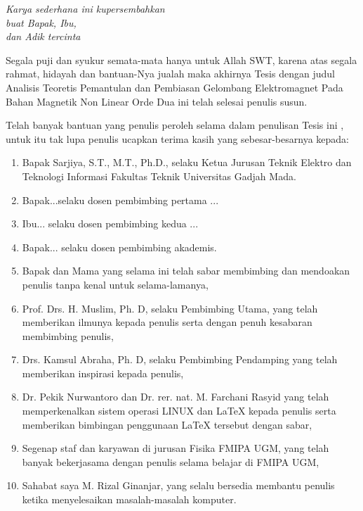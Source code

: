 \documentclass{jtetiskripsi}
\begin{document}
\cover

\approvalpage

\acknowledgment
\begin{flushright}
\emph{Karya sederhana ini kupersembahkan \\
buat Bapak, Ibu,\\dan Adik tercinta}
\end{flushright}

\preface
Segala puji dan syukur semata-mata hanya untuk Allah SWT, karena atas segala
rahmat, hidayah dan bantuan-Nya jualah maka akhirnya Tesis dengan judul
Analisis Teoretis Pemantulan dan Pembiasan Gelombang Elektromagnet Pada
Bahan Magnetik Non Linear Orde Dua ini telah selesai penulis susun.

Telah banyak bantuan yang penulis peroleh selama dalam penulisan Tesis ini
, untuk itu tak lupa penulis ucapkan terima kasih yang sebesar-besarnya
kepada:
\begin{enumerate}
\item{Bapak Sarjiya, S.T., M.T., Ph.D., selaku Ketua Jurusan Teknik Elektro dan Teknologi Informasi Fakultas Teknik Universitas Gadjah Mada.}
\item{Bapak...selaku dosen pembimbing pertama ...}
\item{Ibu... selaku dosen pembimbing kedua ...}
\item{Bapak... selaku dosen pembimbing akademis.}
\item{Bapak dan Mama yang selama ini telah sabar membimbing dan mendoakan
penulis tanpa kenal untuk selama-lamanya,}
\item{Prof. Drs. H. Muslim, Ph. D, selaku Pembimbing Utama, yang telah
memberikan ilmunya kepada penulis serta dengan penuh kesabaran membimbing penulis,}
\item{Drs. Kamsul Abraha, Ph. D, selaku Pembimbing Pendamping yang telah
memberikan inspirasi kepada penulis,} 
\item{Dr. Pekik Nurwantoro dan Dr. rer. nat. M. Farchani Rasyid
yang telah memperkenalkan sistem operasi LINUX dan \LaTeX{} kepada penulis serta
memberikan bimbingan penggunaan \LaTeX{} tersebut dengan sabar,} 
\item{Segenap staf dan karyawan di jurusan Fisika FMIPA UGM, yang telah
banyak bekerjasama dengan penulis selama belajar di FMIPA UGM,} 
\item{Sahabat saya M. Rizal Ginanjar, yang selalu bersedia membantu penulis ketika
menyelesaikan masalah-masalah komputer.} 
\end{enumerate}
\end{document}

